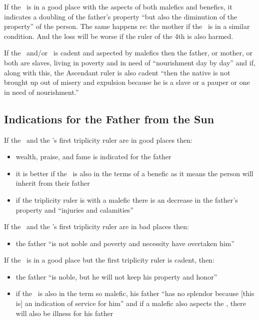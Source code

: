 If the \Sun\, is in a good place with the aspects of both malefics and benefics, it indicates a doubling of the father's property ``but also the diminution of the property'' of the person. The same happens re: the mother if the \Moon\, is in a similar condition. And the loss will be worse if the ruler of the 4th is also harmed.

If the \Sun\, and/or \Moon\, is cadent and aspected by malefics then the father, or mother, or both are slaves, living in poverty and in need of ``nourishment day by day'' and if, along with this, the Ascendant ruler is also cadent ``then the native is not brought up out of misery and expulsion because he is a slave or a pauper or one in need of nourishment.''

\subsection{Indications for the Father from the Sun}

If the \Sun\, and the \Sun's first triplicity ruler are in good places then:
\begin{itemize}[topsep=0em, itemsep=0em]
\item wealth, praise, and fame is indicated for the father
\item it is better if the \Sun\, is also in the terms of a benefic as it means the person will inherit from their father
\item if the triplicity ruler is with a malefic there is an decrease in the father's property and ``injuries and calamities''
\end{itemize}

\noindent If the \Sun\, and the \Sun's first triplicity ruler are in bad places then:
\begin{itemize}[topsep=0em, itemsep=0em]
\item the father ``is not noble and poverty and necessity have overtaken him''
\end{itemize}

\noindent If the \Sun\, is in a good place but the first triplicity ruler is cadent, then:
\begin{itemize}[topsep=0em, itemsep=0em]
\item the father ``is noble, but he will not keep his property and honor''

\item if the \Sun\, is also in the term so malefic, his father ``has no splendor because [this is] an indication of service for him'' and if a malefic  also aspects the \Sun,  there will also be illness for his father
\end{itemize}

